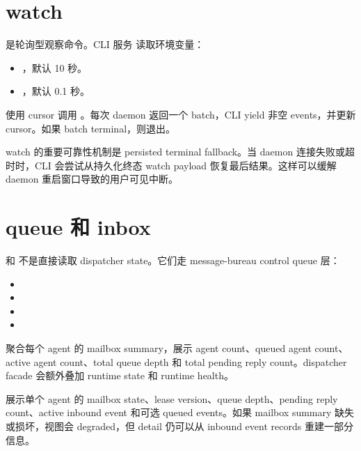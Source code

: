 \section{watch}

 是轮询型观察命令。CLI 服务  读取环境变量：

\begin{itemize}
  \item {}，默认 10 秒。
  \item {}，默认 0.1 秒。
\end{itemize}

 使用 cursor 调用 。每次 daemon 返回一个 batch，CLI yield 非空 events，并更新 cursor。如果 batch terminal，则退出。

watch 的重要可靠性机制是 persisted terminal fallback。当 daemon 连接失败或超时时，CLI 会尝试从持久化终态 watch payload 恢复最后结果。这样可以缓解 daemon 重启窗口导致的用户可见中断。

\section{queue 和 inbox}

 和  不是直接读取 dispatcher state。它们走 message-bureau control queue 层：

\begin{itemize}
  \item {}
  \item {}
  \item {}
  \item {}
\end{itemize}

 聚合每个 agent 的 mailbox summary，展示 agent count、queued agent count、active agent count、total queue depth 和 total pending reply count。dispatcher facade 会额外叠加 runtime state 和 runtime health。

 展示单个 agent 的 mailbox state、lease version、queue depth、pending reply count、active inbound event 和可选 queued events。如果 mailbox summary 缺失或损坏，视图会 degraded，但 detail 仍可以从 inbound event records 重建一部分信息。

